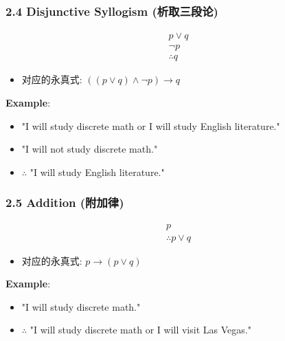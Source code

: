\documentclass[10pt,a4paper,openany]{ctexbook}
\theoremstyle{definition}
\theoremstyle{remark}
\begin{document}
\vspace{-2pt}

\subsubsection{2.4 Disjunctive Syllogism (析取三段论)}

\[
\begin{array}{c}
p \lor q \\
\neg p \\
\hline
\therefore q
\end{array}
\]

\begin{itemize}
\item 对应的永真式: $((p \lor q) \land \neg p) \to q$

\end{itemize}

\textbf{Example}:
\begin{itemize}
\item "I will study discrete math or I will study English literature."
\item "I will not study discrete math."
\item $\therefore$ "I will study English literature."

\end{itemize}

\vspace{-2pt}

\subsubsection{2.5 Addition (附加律)}

\[
\begin{array}{c}
p \\
\hline
\therefore p \lor q
\end{array}
\]

\begin{itemize}
\item 对应的永真式: $p \to (p \lor q)$

\end{itemize}

\textbf{Example}:
\begin{itemize}
\item "I will study discrete math."
\item $\therefore$ "I will study discrete math or I will visit Las Vegas."

\end{itemize}
\end{document}
